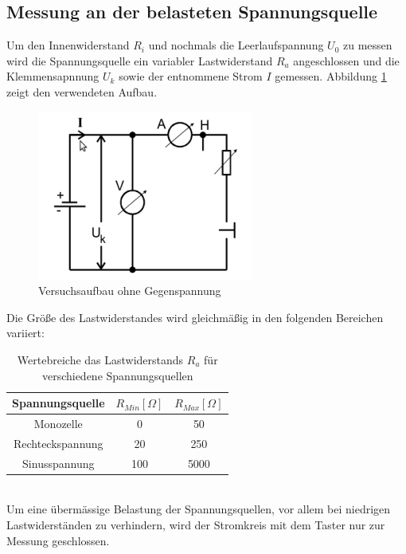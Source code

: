 \documentclass[11pt,ngerman,a4paper]{article}
\begin{document}
\subsection{Messung an der belasteten Spannungsquelle}
Um den Innenwiderstand $R_i$ und nochmals die Leerlaufspannung $U_0$ zu messen wird die Spannungsquelle ein variabler Lastwiderstand $R_a$ angeschlossen und die Klemmensapnnung $U_k$ sowie der entnommene Strom $I$ gemessen. Abbildung \ref{Aufbau1} zeigt den verwendeten Aufbau. 
\begin{figure}[htp]
\centering
\includegraphics[scale=1.00]{abb1.png}
\caption{Versuchsaufbau ohne Gegenspannung}
\label{Aufbau1}
\end{figure}
Die Gr\"o\ss e des Lastwiderstandes wird gleichm\"a\ss ig in den folgenden Bereichen variiert:
\begin{table}[h!]
\centering
\begin{tabular}{|c|c|c|}
\hline
Spannungsquelle& $R_{Min} [\Omega]$& $R_{Max} [\Omega]$\\
\hline
Monozelle & 0& 50\\
Rechteckspannung &  20 & 250\\
Sinusspannung&100& 5000\\
\hline
\end{tabular}

\caption{Wertebreiche das Lastwiderstands $R_a$ f\"ur verschiedene Spannungsquellen}
\end{table}\\
Um eine \"uberm\"assige Belastung der Spannungsquellen, vor allem bei niedrigen Lastwiderst\"anden zu verhindern, wird der Stromkreis mit dem Taster nur zur Messung geschlossen.
\end{document}
